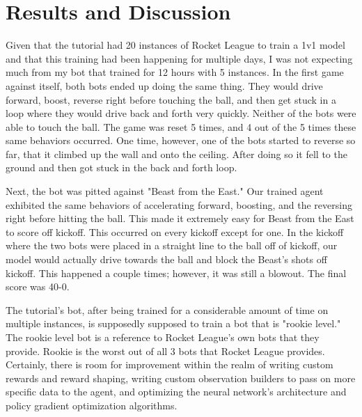 \documentclass[10pt,twocolumn]{article}
\begin{document}
\section{Results and Discussion}

Given that the tutorial had 20 instances of Rocket League to train a 1v1 model and that this training had been happening for multiple days, I was not expecting much from my bot that trained for 12 hours with 5 instances. In the first game against itself, both bots ended up doing the same thing. They would drive forward, boost, reverse right before touching the ball, and then get stuck in a loop where they would drive back and forth very quickly. Neither of the bots were able to touch the ball. The game was reset 5 times, and 4 out of the 5 times these same behaviors occurred. One time, however, one of the bots started to reverse so far, that it climbed up the wall and onto the ceiling. After doing so it fell to the ground and then got stuck in the back and forth loop.

Next, the bot was pitted against "Beast from the East." Our trained agent exhibited the same behaviors of accelerating forward, boosting, and the reversing right before hitting the ball. This made it extremely easy for Beast from the East to score off kickoff. This occurred on every kickoff except for one. In the kickoff where the two bots were placed in a straight line to the ball off of kickoff, our model would actually drive towards the ball and block the Beast's shots off kickoff. This happened a couple times; however, it was still a blowout. The final score was 40-0. 

The tutorial's bot, after being trained for a considerable amount of time on multiple instances, is supposedly supposed to train a bot that is "rookie level." The rookie level bot is a reference to Rocket League's own bots that they provide. Rookie is the worst out of all 3 bots that Rocket League provides. Certainly, there is room for improvement within the realm of writing custom rewards and reward shaping, writing custom observation builders to pass on more specific data to the agent, and optimizing the neural network's architecture and policy gradient optimization algorithms.  

\printbibliography 
\end{document}
